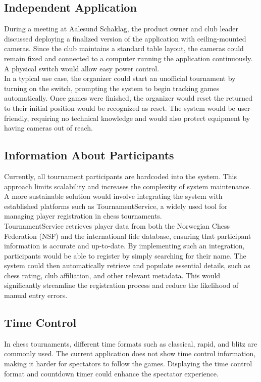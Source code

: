\subsection{Independent Application}
During a meeting at Aalesund Schaklag, the product owner and club leader discussed deploying a finalized version of the application with ceiling-mounted cameras. Since the club maintains a standard table layout, the cameras could remain fixed and connected to a computer running the application continuously. A physical switch would allow easy power control. \\

In a typical use case, the organizer could start an unofficial tournament by turning on the switch, prompting the system to begin tracking games automatically. Once games were finished, the organizer would reset the returned to their initial position would be recognized as reset. The system would be user-friendly, requiring no technical knowledge and would also protect equipment by having cameras out of reach.

\subsection{Information About Participants}
Currently, all tournament participants are hardcoded into the system. This approach limits scalability and increases the complexity of system maintenance. A more sustainable solution would involve integrating the system with established platforms such as TournamentService, a widely used tool for managing player registration in chess tournaments. \\

TournamentService retrieves player data from both the Norwegian Chess Federation (NSF) and the international \gls{fide} database, ensuring that participant information is accurate and up-to-date.
By implementing such an integration, participants would be able to register by simply searching for their name. The system could then automatically retrieve and populate essential details, such as chess rating, club affiliation, and other relevant metadata. This would significantly streamline the registration process and reduce the likelihood of manual entry errors. \\


\subsection{Time Control}
In chess tournaments, different time formats such as \gls{classical}, \gls{rapid}, and \gls{blitz} are commonly used. The current application does not show time control information, making it harder for spectators to follow the games. Displaying the time control format and countdown timer could enhance the spectator experience. \\

